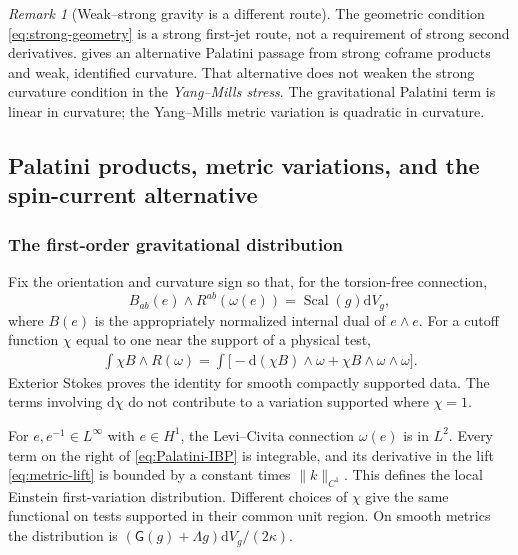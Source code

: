 \documentclass[11pt]{article}
\numberwithin{equation}{section}
\theoremstyle{definition}
\theoremstyle{remark}
\newtheorem{remark}[remark]{Remark}
\newcommand{\dd}{\mathrm d}
\newcommand{\Scal}{\operatorname{Scal}}
\newcommand{\norm}[1]{\lVert#1\rVert}
\newcommand{\Eins}{\mathsf G}
\newcommand{\dV}{\dd V}
\begin{document}
\begin{remark}[Weak--strong gravity is a different route]
The geometric condition \eqref{eq:strong-geometry} is a strong first-jet route, not a requirement of strong second derivatives.  gives an alternative Palatini passage from strong coframe products and weak, identified curvature. That alternative does not weaken the strong curvature condition in the \emph{Yang--Mills stress}. The gravitational Palatini term is linear in curvature; the Yang--Mills metric variation is quadratic in curvature.
\end{remark}

\subsection{Palatini products, metric variations, and the spin-current alternative}
\label{app:palatini}

\subsubsection{The first-order gravitational distribution}

Fix the orientation and curvature sign so that, for the torsion-free connection,
\begin{equation}
 B_{ab}(e)\wedge R^{ab}(\omega(e))=\Scal(g)\dV_g,
 \label{eq:B-normalization}
\end{equation}
where $B(e)$ is the appropriately normalized internal dual of $e\wedge e$. For a cutoff function $\chi$ equal to one near the support of a physical test,
\begin{align}
 \int\chi B\wedge R(\omega)
 =\int\bigl[-\dd(\chi B)\wedge\omega
              +\chi B\wedge\omega\wedge\omega\bigr].
 \label{eq:Palatini-IBP}
\end{align}
Exterior Stokes proves the identity for smooth compactly supported data. The terms involving $\dd\chi$ do not contribute to a variation supported where $\chi=1$.

For $e,e^{-1}\in L^\infty$ with $e\in H^1$, the Levi--Civita connection $\omega(e)$ is in $L^2$. Every term on the right of \eqref{eq:Palatini-IBP} is integrable, and its derivative in the lift \eqref{eq:metric-lift} is bounded by a constant times $\norm k_{C^1}$. This defines the local Einstein first-variation distribution. Different choices of $\chi$ give the same functional on tests supported in their common unit region. On smooth metrics the distribution is $(\Eins(g)+\Lambda g)\dV_g/(2\kappa)$.
\end{document}
